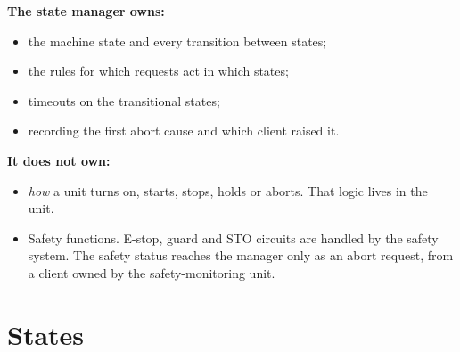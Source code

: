 \documentclass[11pt,a4paper]{report}
\begin{document}
\begin{minipage}[t]{0.48\linewidth}
\textbf{The state manager owns:}
\begin{itemize}
  \item the machine state and every transition between states;
  \item the rules for which requests act in which states;
  \item timeouts on the transitional states;
  \item recording the first abort cause and which client raised it.
\end{itemize}
\end{minipage}\hfill
\begin{minipage}[t]{0.48\linewidth}
\textbf{It does not own:}
\begin{itemize}
  \item \emph{how} a unit turns on, starts, stops, holds or aborts. That logic lives in the
        unit.
  \item Safety functions. E-stop, guard and STO circuits are handled by the safety system. The
        safety status reaches the manager only as an abort request, from a client owned by the
        safety-monitoring unit.
\end{itemize}
\end{minipage}

\section{States}
\end{document}
